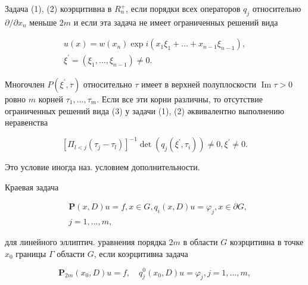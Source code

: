 \documentclass[10pt]{article}
\begin{document}
Задача (1), (2) коэрцитивна в $R_{n}^{+}$, если порядки всех операторов $q_{j}$ относительно $\partial / \partial x_{n}$ меньше $2 m$ и если эта задача не имеет ограниченных решений вида



\[

\begin{gathered}

u(x)=w\left(x_{n}\right) \exp i\left(x_{1} \xi_{1}+\ldots+x_{n-1} \xi_{n-1}\right), \\

\xi^{\prime}=\left(\xi_{1}, \ldots, \xi_{n-1}\right) \neq 0 .

\end{gathered}

\]



Многочлен $P\left(\xi^{\prime}, \tau\right)$ относительно $\tau$ имеет в верхней полуплоскости $\operatorname{Im} \tau>0$ ровно $m$ корней $\tau_{1}, \ldots, \tau_{m}$. Если все эти корни различны, то отсутствие ограниченных решений вида (3) у задачи (1), (2) әквивалентно выполнению неравенства



\[

\left[\Pi_{l<j}\left(\tau_{j}-\tau_{l}\right)\right]^{-1} \operatorname{det}\left(q_{j}\left(\xi^{\prime}, \tau_{i}\right)\right) \neq 0, \xi^{\prime} \neq 0 .

\]



Это условие иногда наз. условием дополнительности.



Краевая задача



\[

\begin{aligned}

& \boldsymbol{P}(x, D) u=f, x \in G, q_{i}(x, D) u=\varphi_{j}, x \in \partial G, \\

& j=1, \ldots, m \text {, }

\end{aligned}

\]



для линейного эллиптич. уравнения порядка $2 m$ в области $G$ коэрцитивна в точке $x_{0}$ границы $\Gamma$ области $G$, если коэрцитивна задача



\[

\boldsymbol{P}_{2 m}\left(x_{0}, D\right) u=f, \quad q_{j}^{0}\left(x_{0}, D\right) u=\varphi_{j}, j=1, \ldots, m,

\]
\end{document}
